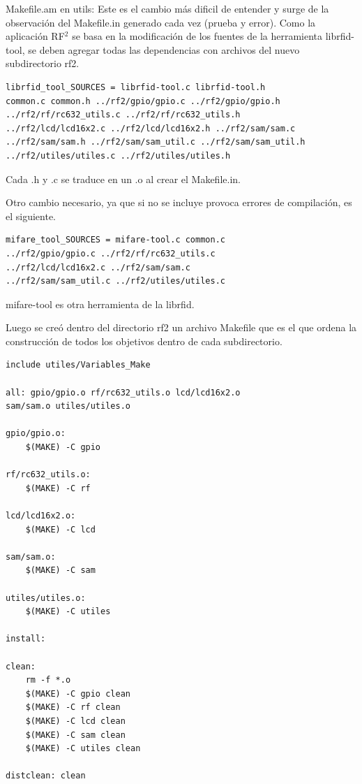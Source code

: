 \bigskip
Makefile.am en utils:
Este es el cambio más dificil de entender y surge de la observación del Makefile.in generado cada vez (prueba y error). Como la aplicación RF$^{2}$ se basa en la modificación de los fuentes de la herramienta librfid-tool, se deben agregar todas las dependencias con archivos del nuevo subdirectorio rf2.

\begin{verbatim}
librfid_tool_SOURCES = librfid-tool.c librfid-tool.h 
common.c common.h ../rf2/gpio/gpio.c ../rf2/gpio/gpio.h 
../rf2/rf/rc632_utils.c ../rf2/rf/rc632_utils.h 
../rf2/lcd/lcd16x2.c ../rf2/lcd/lcd16x2.h ../rf2/sam/sam.c 
../rf2/sam/sam.h ../rf2/sam/sam_util.c ../rf2/sam/sam_util.h 
../rf2/utiles/utiles.c ../rf2/utiles/utiles.h
\end{verbatim}

Cada .h y .c se traduce en un .o al crear el Makefile.in.

\bigskip
Otro cambio necesario, ya que si no se incluye provoca errores de compilación, es el siguiente.

\begin{verbatim}
mifare_tool_SOURCES = mifare-tool.c common.c 
../rf2/gpio/gpio.c ../rf2/rf/rc632_utils.c 
../rf2/lcd/lcd16x2.c ../rf2/sam/sam.c 
../rf2/sam/sam_util.c ../rf2/utiles/utiles.c
\end{verbatim}

mifare-tool es otra herramienta de la librfid.

\bigskip
Luego se creó dentro del directorio rf2 un archivo Makefile que es el que ordena la construcción de todos los objetivos dentro de cada subdirectorio.

\begin{verbatim}
include utiles/Variables_Make 

all: gpio/gpio.o rf/rc632_utils.o lcd/lcd16x2.o 
sam/sam.o utiles/utiles.o 

gpio/gpio.o: 
	$(MAKE) -C gpio 

rf/rc632_utils.o: 
	$(MAKE) -C rf 

lcd/lcd16x2.o: 
	$(MAKE) -C lcd 

sam/sam.o: 
	$(MAKE) -C sam 
	 
utiles/utiles.o: 
	$(MAKE) -C utiles 

install: 

clean: 
	rm -f *.o 
	$(MAKE) -C gpio clean 
	$(MAKE) -C rf clean 
	$(MAKE) -C lcd clean 
	$(MAKE) -C sam clean 
	$(MAKE) -C utiles clean 

distclean: clean
\end{verbatim}

